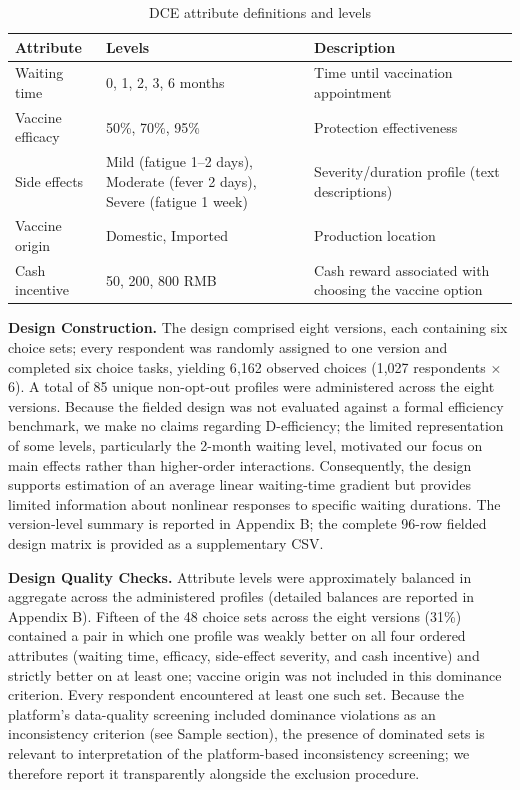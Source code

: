\documentclass[12pt]{article}
\begin{document}
\begin{table}[htbp]
\centering
\caption{DCE attribute definitions and levels}
\label{tab:dce_attributes}
\begin{tabularx}{\textwidth}{LLL}
\hline
Attribute & Levels & Description \\
\hline
Waiting time & 0, 1, 2, 3, 6 months & Time until vaccination appointment \\
Vaccine efficacy & 50\%, 70\%, 95\% & Protection effectiveness \\
Side effects & Mild (fatigue 1--2 days), Moderate (fever 2 days), Severe (fatigue 1 week) & Severity/duration profile (text descriptions) \\
Vaccine origin & Domestic, Imported & Production location \\
Cash incentive & 50, 200, 800 RMB & Cash reward associated with choosing the vaccine option \\
\hline
\end{tabularx}
\end{table}

\textbf{Design Construction.} The design comprised eight versions, each containing six choice sets; every respondent was randomly assigned to one version and completed six choice tasks, yielding 6{,}162 observed choices (1{,}027 respondents $\times$ 6). A total of 85 unique non-opt-out profiles were administered across the eight versions. Because the fielded design was not evaluated against a formal efficiency benchmark, we make no claims regarding D-efficiency; the limited representation of some levels, particularly the 2-month waiting level, motivated our focus on main effects rather than higher-order interactions. Consequently, the design supports estimation of an average linear waiting-time gradient but provides limited information about nonlinear responses to specific waiting durations. The version-level summary is reported in Appendix B; the complete 96-row fielded design matrix is provided as a supplementary CSV.

\textbf{Design Quality Checks.} Attribute levels were approximately balanced in aggregate across the administered profiles (detailed balances are reported in Appendix B). Fifteen of the 48 choice sets across the eight versions (31\%) contained a pair in which one profile was weakly better on all four ordered attributes (waiting time, efficacy, side-effect severity, and cash incentive) and strictly better on at least one; vaccine origin was not included in this dominance criterion. Every respondent encountered at least one such set. Because the platform's data-quality screening included dominance violations as an inconsistency criterion (see Sample section), the presence of dominated sets is relevant to interpretation of the platform-based inconsistency screening; we therefore report it transparently alongside the exclusion procedure.
\end{document}
